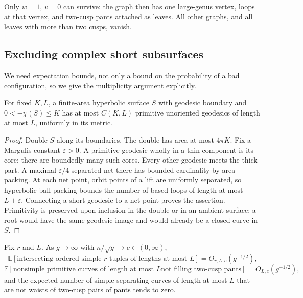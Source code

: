Only $w=1$, $v=0$ can survive: the graph then has one large-genus
vertex, loops at that vertex, and two-cusp pants attached as leaves.
All other graphs, and all leaves with more than two cusps, vanish.

\subsection{Excluding complex short subsurfaces}\label{subsec:critical-exclusion}

We need expectation bounds, not only a bound on the probability of a
bad configuration, so we give the multiplicity argument explicitly.

\begin{lemma}\label{lem:primitive-count}
For fixed $K,L$, a finite-area hyperbolic surface $S$ with geodesic
boundary and $0<-\chi(S)\le K$ has at most $C(K,L)$ primitive
unoriented geodesics of length at most $L$, uniformly in its metric.
\end{lemma}

\begin{proof}
Double $S$ along its boundaries. The double has area at
most $4\pi K$. Fix a Margulis constant $\varepsilon>0$. A primitive
geodesic wholly in a thin component is its core; there are boundedly
many such cores. Every other geodesic meets the thick part. A maximal
$\varepsilon/4$-separated net there has bounded cardinality by area
packing. At each net point, orbit points of a lift are uniformly
separated, so hyperbolic ball packing bounds the number of based
loops of length at most $L+\varepsilon$. Connecting a short geodesic
to a net point proves the assertion. Primitivity is preserved upon
inclusion in the double or in an ambient surface: a root would have
the same geodesic image and would already be a closed curve in $S$.
\end{proof}

\begin{lemma}\label{lem:critical-complex}
Fix $r$ and $L$. As $g\to\infty$ with $n/\sqrt g\to c\in(0,\infty)$,
\begin{equation}
 \mathbb E[\text{intersecting ordered simple $r$-tuples of lengths
 at most $L$}]=O_{r,L,c}(g^{-1/2}),
 \label{eq:critical-intersections}
\end{equation}
\begin{equation}
 \mathbb E[\text{nonsimple primitive curves of length at most $L$
 not filling two-cusp pants}]=O_{L,c}(g^{-1/2}),
 \label{eq:critical-bad-curves}
\end{equation}
and the expected number of simple separating curves of length at most $L$
that are not waists of two-cusp pairs of pants tends to zero.
\end{lemma}

